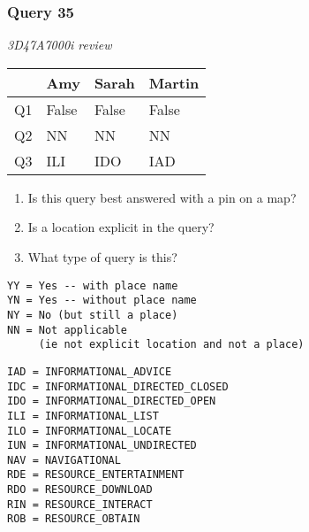 \begin{frame}[fragile]
\frametitle{Query 35}
\vspace{1em}

\emph{3D47A7000i review}

\vfill

\begin{table}
  \centering
  \begin{tabular}{ l l l l }
    & \textbf{Amy} & \textbf{Sarah} & \textbf{Martin}\\
    \toprule
    Q1 & False & False & False\\
Q2 & NN & NN & NN\\
Q3 & ILI & IDO & IAD\\
    \bottomrule
  \end{tabular}
\end{table}

\vfill

\tiny{

\begin{enumerate}
\item Is this query best answered with a pin on a map?
\item Is a location explicit in the query?
\item What type of query is this?
\end{enumerate}

\vfill

\begin{multicols}{2}
\begin{verbatim}
YY = Yes -- with place name
YN = Yes -- without place name
NY = No (but still a place)
NN = Not applicable 
     (ie not explicit location and not a place)
\end{verbatim}

\columnbreak
\begin{verbatim}
IAD = INFORMATIONAL_ADVICE
IDC = INFORMATIONAL_DIRECTED_CLOSED
IDO = INFORMATIONAL_DIRECTED_OPEN
ILI = INFORMATIONAL_LIST
ILO = INFORMATIONAL_LOCATE
IUN = INFORMATIONAL_UNDIRECTED
NAV = NAVIGATIONAL
RDE = RESOURCE_ENTERTAINMENT
RDO = RESOURCE_DOWNLOAD
RIN = RESOURCE_INTERACT
ROB = RESOURCE_OBTAIN
\end{verbatim}
\end{multicols}
}

\end{frame}


